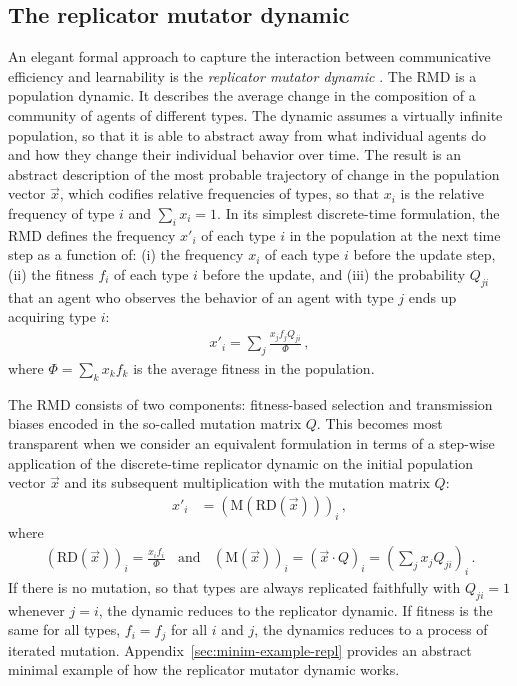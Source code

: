 \documentclass[a4paper, 11pt]{article}
\theoremstyle{Satz}
\begin{document}
\subsection{The replicator mutator dynamic}
An elegant formal approach to capture the interaction between communicative efficiency and
learnability is the \emph{replicator mutator dynamic}
\citep{Hofbauer1985:The-Selection-M,nowak+etal:2000,NowakKomarova2001:Evolution-of-Un,hofbauer+sigmund:2003,nowak:2006}. The
RMD is a population dynamic. It describes the average change in the composition of a community
of agents of different types. The dynamic assumes a virtually infinite population, so that it
is able to abstract away from what individual agents do and how they change their individual
behavior over time. The result is an abstract description of the most probable trajectory of
change in the population vector $\vec{x}$, which codifies relative frequencies of types, so
that $x_i$ is the relative frequency of type $i$ and $\sum\nolimits_i x_i = 1$. In its
simplest discrete-time formulation, the RMD defines the frequency $x'_i$ of each type $i$ in
the population at the next time step as a function of: (i) the frequency $x_i$ of each type $i$
before the update step, (ii) the fitness $f_i$ of each type $i$ before the update, and (iii)
the probability $Q_{ji}$ that an agent who observes the behavior of an agent with type $j$ ends
up acquiring type $i$:
\begin{align}
  \label{eq:RMD_discrete}
  x'_i = \sum_j \frac{x_jf_j Q_{ji}}{\Phi}\,,
\end{align}
where $\Phi = \sum_k x_k f_k$ is the average fitness in the population.  


The RMD consists of two components: fitness-based selection and transmission biases encoded in
the so-called mutation matrix $Q$. This becomes most transparent when we consider an equivalent
formulation in terms of a step-wise application of the discrete-time replicator dynamic
\citep{TaylorJonker1978:Evolutionary-St} on the initial population vector $\vec{x}$ and its
subsequent multiplication with the mutation matrix $Q$:
\begin{align}
  \label{eq:RMD_discrete_recast}
  x'_i & = (\text{M}(\text{RD}(\vec{x})))_i\,,
\end{align}
where
\begin{align*}
      \left ( \text{RD}(\vec{x}) \right )_i 
         = \frac{x_i f_i}{\Phi}
 \ \ \ \ \text{and} \ \ \ \ 
  (\text{M}(\vec{x}))_i = (\vec{x} \cdot Q)_i = \left ( \sum_j
          x_j Q_{ji} \right)_i\,.
\end{align*}
%
If there is no mutation, so that types are always replicated faithfully with $Q_{ji}=1$
whenever $j=i$, the dynamic reduces to the replicator dynamic. If fitness is the same for all
types, $f_i = f_j$ for all $i$ and $j$, the dynamics reduces to a process of iterated
mutation. Appendix~\ref{sec:minim-example-repl} provides an abstract minimal example of how the
replicator mutator dynamic works.
\end{document}
